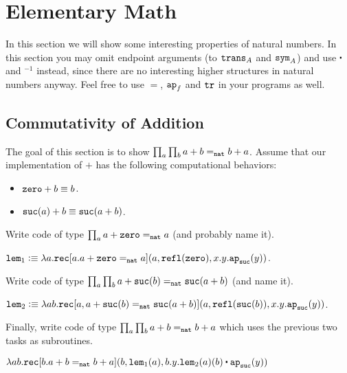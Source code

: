 \documentclass[12pt]{article}
\newcommand{\cut}[1]{}
\newcommand{\marksolution}[1]{\color{FireBrick}#1\normalcolor}%
\newcommand{\marksolution}[1]{\cut{#1}}%
\newenvironment{solution}{\trivlist \item[\hskip \labelsep{\bf
Solution:}]}{\endtrivlist}
\begin{document}
\section{Elementary Math}

In this section we will show some interesting properties of natural numbers.
In this section you may omit endpoint arguments (to $\mathtt{trans}_A$ and $\mathtt{sym}_A$)
and use $\concat$ and $^{-1}$ instead,
since there are no interesting higher structures in natural numbers anyway.
Feel free to use $=$, $\mathtt{ap}_f$ and $\mathtt{tr}$ in your programs as well.

\subsection{Commutativity of Addition}

The goal of this section is to show $\prod_a \prod_b a + b =_{\mathtt{nat}} b + a$.
Assume that our implementation of $+$ has the following computational behaviors:
\begin{itemize}
  \item $\mathtt{zero} + b \equiv b$.
  \item $\mathtt{suc}(a) + b \equiv \mathtt{suc}(a + b)$.
\end{itemize}

\begin{task}
  Write code of type $\prod_a a + \mathtt{zero} =_{\mathtt{nat}} a$ (and probably name it).
\end{task}
\marksolution{
  \begin{solution}
    $\mathtt{lem}_1 \vcentcolon\equiv \lambda a.\mathtt{rec}[a.a+\mathtt{zero}=_{\mathtt{nat}} a](a, \mathtt{refl}(\mathtt{zero}), x.y.\mathtt{ap}_{\mathtt{suc}}(y))$.
  \end{solution}
}
\begin{task}
  Write code of type $\prod_a \prod_b a + \mathtt{suc}(b) =_{\mathtt{nat}} \mathtt{suc}(a + b)$ (and name it).
\end{task}
\marksolution{
  \begin{solution}
    $\mathtt{lem}_2 \vcentcolon\equiv \lambda ab.\mathtt{rec}[a,a+\mathtt{suc}(b)=_{\mathtt{nat}}\mathtt{suc}(a+b)](a, \mathtt{refl}(\mathtt{suc}(b)), x.y.\mathtt{ap}_{\mathtt{suc}}(y))$.
  \end{solution}
}
\begin{task}
  Finally, write code of type $\prod_a \prod_b a + b =_{\mathtt{nat}} b + a$
  which uses the previous two tasks as subroutines.
\end{task}
\marksolution{
  \begin{solution}
    $\lambda ab.\rec[b.a+b=_\nat b+a](b, \mathtt{lem}_1(a), b.y.\mathtt{lem}_2(a)(b) \concat \ap_\suc(y))$
  \end{solution}
}
\end{document}
